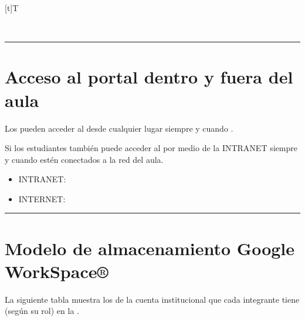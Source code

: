 \documentclass[letterpaper,10pt,spanish]{sphinxmanual}
\let\sphinxpxdimen\pdfpxdimen\else\newdimen\sphinxpxdimen
\begin{document}
\begin{savenotes}\sphinxattablestart
\sphinxthistablewithglobalstyle
\centering
\begin{tabulary}{\linewidth}[t]{T}
\sphinxtoprule
\sphinxtableatstartofbodyhook

\begin{sphinxfigure-in-table}
\centering
\capstart
\noindent\sphinxincludegraphics[width=400\sphinxpxdimen]{{sello}.png}
\label{\detokenize{informacion:id1}}\end{sphinxfigure-in-table}\relax
\\
\sphinxbottomrule
\end{tabulary}
\sphinxtableafterendhook\par
\sphinxattableend\end{savenotes}


\bigskip\hrule\bigskip



\section{Acceso al portal dentro y fuera del aula}
\label{\detokenize{informacion:acceso-al-portal-dentro-y-fuera-del-aula}}
\sphinxAtStartPar
Los  pueden acceder al  desde cualquier lugar siempre y cuando .

\sphinxAtStartPar
Si los estudiantes también puede acceder al  por medio de la INTRANET siempre y cuando estén conectados a la red del aula.
\begin{itemize}
\item {} 
\sphinxAtStartPar
INTRANET: 

\item {} 
\sphinxAtStartPar
INTERNET: 

\end{itemize}


\bigskip\hrule\bigskip



\section{Modelo de almacenamiento Google WorkSpace®}
\label{\detokenize{informacion:modelo-de-almacenamiento-google-workspace}}
\sphinxAtStartPar
La siguiente tabla muestra los  de la cuenta institucional que cada integrante tiene (según su rol) en la .
\end{document}
